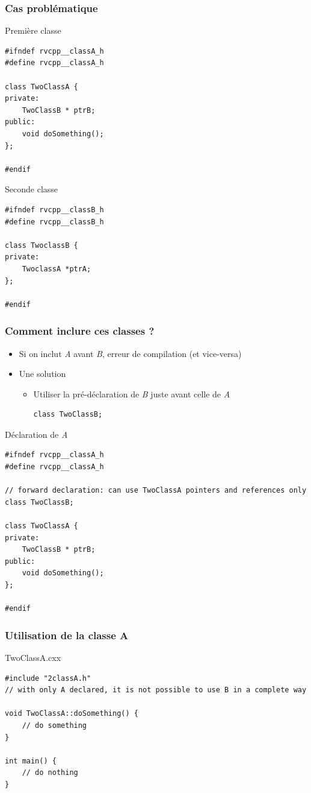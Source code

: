 \begin{frame}[fragile]
\frametitle{Cas problématique}
\begin{exampleblock}{Première classe}
\begin{lstlisting}
#ifndef rvcpp__classA_h
#define rvcpp__classA_h

class TwoClassA {
private:
    TwoClassB * ptrB;
public:
    void doSomething();
};

#endif
\end{lstlisting}
\end{exampleblock}
\begin{block}{Seconde classe}
\begin{lstlisting}
#ifndef rvcpp__classB_h
#define rvcpp__classB_h

class TwoclassB {
private:
    TwoclassA *ptrA;
};

#endif
\end{lstlisting}
\end{block}
\end{frame}

\begin{frame}[fragile]
\frametitle{Comment inclure ces classes ?}
\begin{itemize}
\item Si on inclut \textit{A} avant \textit{B}, erreur de compilation (et vice-versa)
\item Une solution
\begin{itemize}
\item Utiliser la pré-déclaration de \textit{B} juste avant celle de \textit{A}
\begin{lstlisting}
class TwoClassB;
\end{lstlisting}
\end{itemize}
\end{itemize}
\begin{exampleblock}{Déclaration de \textit{A}}
\begin{lstlisting}
#ifndef rvcpp__classA_h
#define rvcpp__classA_h

// forward declaration: can use TwoClassA pointers and references only
class TwoClassB;

class TwoClassA {
private:
    TwoClassB * ptrB;
public:
    void doSomething();
};

#endif
\end{lstlisting}
\end{exampleblock}
\end{frame}

\begin{frame}[fragile]
\frametitle{Utilisation de la classe A}
\begin{exampleblock}{TwoClassA.cxx}
\begin{lstlisting}
#include "2classA.h"
// with only A declared, it is not possible to use B in a complete way

void TwoClassA::doSomething() {
    // do something
}

int main() {
    // do nothing
}
\end{lstlisting}
\end{exampleblock}
\end{frame}

